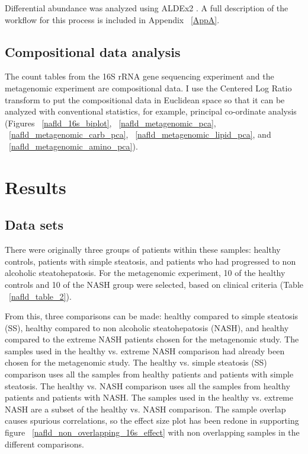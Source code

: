 Differential abundance was analyzed using ALDEx2 \cite{fernandes2014unifying}. A full description of the workflow for this process is included in Appendix ~\ref{AppA}.

\subsection{Compositional data analysis}

The count tables from the 16S rRNA gene sequencing experiment and the metagenomic experiment are compositional data. I use the Centered Log Ratio transform \cite{} to put the compositional data in Euclidean space so that it can be analyzed with conventional statistics, for example, principal co-ordinate analysis (Figures ~\ref{nafld_16s_biplot}, ~\ref{nafld_metagenomic_pca}, ~\ref{nafld_metagenomic_carb_pca}, ~\ref{nafld_metagenomic_lipid_pca}, and ~\ref{nafld_metagenomic_amino_pca}).

\FloatBarrier

\section{Results}

\subsection{Data sets}
There were originally three groups of patients within these samples: healthy controls, patients with simple steatosis, and patients who had progressed to non alcoholic steatohepatosis. For the metagenomic experiment, 10 of the healthy controls and 10 of the NASH group were selected, based on clinical criteria (Table ~\ref{nafld_table_2}).

From this, three comparisons can be made: healthy compared to simple steatosis (SS), healthy compared to non alcoholic steatohepatosis (NASH), and healthy compared to the extreme NASH patients chosen for the metagenomic study. The samples used in the healthy vs. extreme NASH comparison had already been chosen for the metagenomic study. The healthy vs. simple steatosis (SS) comparison uses all the samples from healthy patients and patients with simple steatosis. The healthy vs. NASH comparison uses all the samples from healthy patients and patients with NASH. The samples used in the healthy vs. extreme NASH are a subset of the healthy vs. NASH comparison. The sample overlap causes spurious correlations, so the effect size plot has been redone in supporting figure ~\ref{nafld_non_overlapping_16s_effect} with non overlapping samples in the different comparisons.

